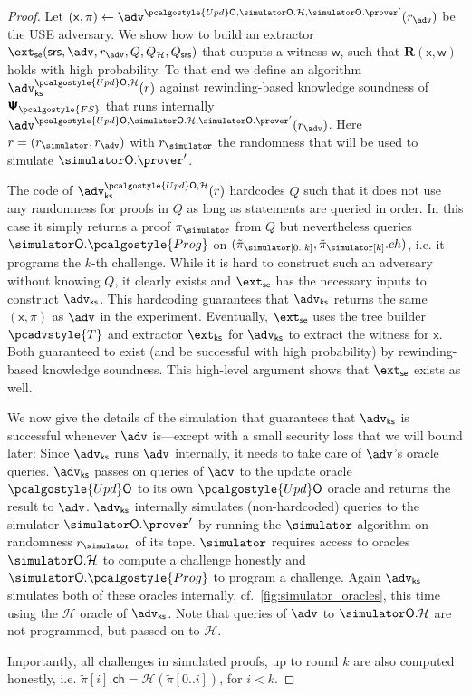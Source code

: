 \documentclass[10pt]{llncs}
\newcommand{\zkproofs}{\zkproof_\simulator}
\newcommand{\tzkproofs}{\tilde\zkproof_\simulator}
\newcommand{\simO}{\simulator\oracleo}
\newcommand{\simOH}{\simO.\ro}
\newcommand{\simOHprog}{\simO.\prog}
\newcommand{\simOP}{\simO.\prover}
\newcommand{\initU}{\pcalgostyle{Upd}\oracleo}
\newcommand{\pcvarstyle}[1]{\mathsf{#1}}
\newcommand{\oracleo}{\mathsf{O}}
\newcommand{\srs}{\pcvarstyle{srs}}
\newcommand{\zkproof}{\pi}
\newcommand{\tzkproof}{\tilde{\zkproof}}
\newcommand{\proofsystem}{\pcschemestyle{\Psi}}
\newcommand{\psfs}{\proofsystem_\fs}
\newcommand{\ro}{\mathcal{H}}
\newcommand{\fs}{\pcalgostyle{FS}}
\newcommand{\se}{\pcvarstyle{se}}
\newcommand{\pcschemestyle}[1]{\bm{\mathsf{#1}}}
\newcommand{\tdv}{\pcadvstyle{T}}
\newcommand{\ch}{\pcvarstyle{ch}}
\newcommand{\REL}{\mathbf{R}}
\newcommand{\inp}{\pcvarstyle{x}}
\newcommand{\wit}{\pcvarstyle{w}}
\newcommand{\prog}{\pcalgostyle{Prog}}
\newcommand{\extse}{\ext_\se}
\newcommand{\extcss}{\ext_{\css}}
\newcommand{\css}{\pcvarstyle{ks}}
\newcommand{\advse}{\adv}
\newcommand{\advcss}{\adv_{\pcvarstyle{ks}}}
\newcommand{\Qro}{Q_{\ro}}
\newcommand{\Qsrs}{Q_{\pcvarstyle{srs}}}
\newcommand{\Qsim}{Q}
\newcommand{\rsim}{r_\simulator}
\begin{document}
\begin{proof}	
	Let $(\inp, \zkproof) \gets \advse^{\initU, \simOH, \simOP'}(r_{\advse})$ be the USE adversary. We show how to build an extractor $\extse (\srs, \advse, r_{\advse}, \Qsim, \Qro, \Qsrs)$ that outputs a witness $\wit$, such that $\REL(\inp, \wit)$ holds with high probability. To that end we define an algorithm $\advcss^{\initU,\ro}(r)$ against rewinding-based knowledge soundness of $\psfs$ that runs internally $\advse^{\initU, \simOH, \simOP'}(r_{\advse})$. Here $r = (\rsim, r_{\advse})$ with $\rsim$ the randomness that will be used to simulate $\simOP'$. 
	
	The code of $\advcss^{\initU,\ro}(r)$ hardcodes $\Qsim$ such that it does not use any randomness for proofs in $\Qsim$ as long as statements are queried in order. In this case it simply returns a proof $\zkproofs$ from $\Qsim$ but nevertheless queries $\simOHprog$ on $(\tzkproofs[0..k],\tzkproofs[k].ch)$, i.e. it programs the $k$-th challenge. While it is hard to construct such an adversary without knowing $\Qsim$, it clearly exists and $\extse$ has the necessary inputs to construct $\advcss$. This hardcoding guarantees that $\advcss$ returns the same $(\inp,\zkproof)$ as $\advse$ in the experiment.
	Eventually, $\extse$ uses the tree builder $\tdv$ and extractor $\extcss$ for $\advcss$ to extract the witness for $\inp$. Both guaranteed to exist (and be successful with high probability) by rewinding-based knowledge soundness. This high-level argument shows that $\extse$ exists as well.
	
	We now give the details of the simulation that guarantees that $\advcss$ is successful whenever $\advse$ is---except with a small security loss that we will bound later:
	Since $\advcss$ runs $\advse$ internally, it needs to take care of $\advse$'s oracle queries.
	$\advcss$ passes on queries of $\advse$ to the update oracle $\initU$ to its own $\initU$ oracle and returns the result to $\advse$.
	$\advcss$ internally simulates (non-hardcoded) queries to the simulator $\simOP'$ by running the $\simulator$ algorithm on randomness $\rsim$ of its tape. $\simulator$ requires access to oracles $\simOH$ to compute a challenge honestly and $\simOHprog$ to program a challenge. Again $\advcss$ simulates both of these oracles internally, cf.~\cref{fig:simulator_oracles}, this time using the $\ro$ oracle of $\advcss$. 	Note that queries of $\advse$ to $\simOH$ are not programmed, but passed on to $\ro$. 
	
	Importantly, all challenges in simulated proofs, up to round $k$ are also computed honestly, i.e. $\tzkproof[i].\ch = \ro(\tzkproof[0..i])$, for $i < k$.
	

\end{proof}
\end{document}

